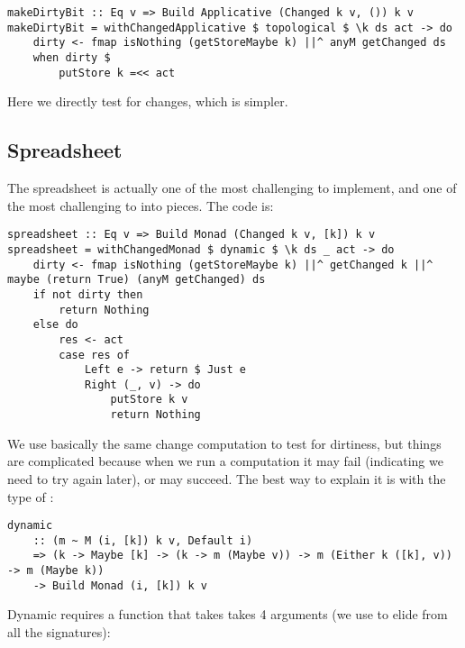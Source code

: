 \begin{verbatim}
makeDirtyBit :: Eq v => Build Applicative (Changed k v, ()) k v
makeDirtyBit = withChangedApplicative $ topological $ \k ds act -> do
    dirty <- fmap isNothing (getStoreMaybe k) ||^ anyM getChanged ds
    when dirty $
        putStore k =<< act
\end{verbatim}

Here we directly test for changes, which is simpler.

\subsection{Spreadsheet}

The spreadsheet is actually one of the most challenging to implement, and one of the most challenging to into pieces. The code is:

\begin{verbatim}
spreadsheet :: Eq v => Build Monad (Changed k v, [k]) k v
spreadsheet = withChangedMonad $ dynamic $ \k ds _ act -> do
    dirty <- fmap isNothing (getStoreMaybe k) ||^ getChanged k ||^ maybe (return True) (anyM getChanged) ds
    if not dirty then
        return Nothing
    else do
        res <- act
        case res of
            Left e -> return $ Just e
            Right (_, v) -> do
                putStore k v
                return Nothing
\end{verbatim}

We use basically the same change computation to test for dirtiness, but things are complicated because when we run a computation it may fail (indicating we need to try again later), or may succeed. The best way to explain it is with the type of :

\begin{verbatim}
dynamic
    :: (m ~ M (i, [k]) k v, Default i)
    => (k -> Maybe [k] -> (k -> m (Maybe v)) -> m (Either k ([k], v)) -> m (Maybe k))
    -> Build Monad (i, [k]) k v
\end{verbatim}

Dynamic requires a function that takes takes 4 arguments (we use  to elide  from all the signatures):

